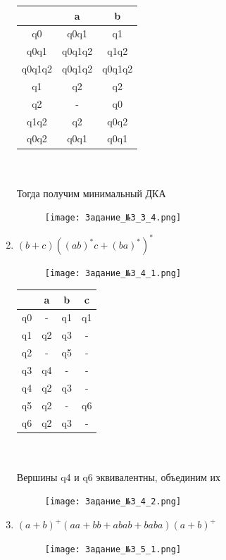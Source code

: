 \documentclass[a4paper]{article}
\begin{document}
\begin{enumerate}
\newpage
\begin{tabular}{|*{3}{c|}}
\textbf{ } & a & b \\
\hline\hline
q0 & q0q1 & q1 \\
\hline\hline
q0q1 & q0q1q2 & q1q2 \\
\hline\hline
q0q1q2 & q0q1q2 & q0q1q2 \\
\hline\hline
q1 & q2 & q2 \\
\hline\hline
q2 & - & q0 \\
\hline\hline
q1q2 & q2 & q0q2 \\
\hline\hline
q0q2 & q0q1 & q0q1 \\
\end{tabular}
\\
\\Тогда получим минимальный ДКА \\
\begin{figure}[h]
\centering
\texttt{[image: Задание\_№3\_3\_4.png]}
\end{figure}

\newpage
\item $(b+c)((ab)^*c+(ba)^*)^*$\\
\begin{figure}[h]
\centering
\texttt{[image: Задание\_№3\_4\_1.png]}
\end{figure}

\begin{tabular}{|*{4}{c|}}
\textbf{ } & a & b & c\\
\hline\hline
q0 & - & q1 & q1 \\
\hline\hline
q1 & q2 & q3 & - \\
\hline\hline
q2 & - & q5 & - \\
\hline\hline
q3 & q4 & - & - \\
\hline\hline
q4 & q2 & q3 & - \\
\hline\hline
q5 & q2 & - & q6 \\
\hline\hline
q6 & q2 & q3 & - \\
\end{tabular}
\\

\\Вершины q4 и q6 эквивалентны, объединим их\\
\begin{figure}[h]
\centering
\texttt{[image: Задание\_№3\_4\_2.png]}
\end{figure}


\item $(a+b)^+ (aa+bb+abab+baba)(a+b)^+$\\
\begin{figure}[h]
\centering
\texttt{[image: Задание\_№3\_5\_1.png]}
\end{figure}


\end{enumerate}
\end{document}
